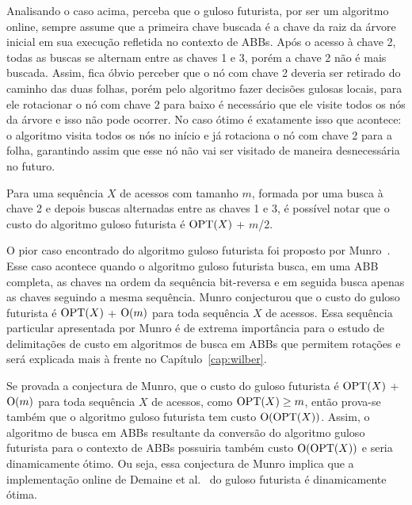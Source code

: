 Analisando o caso acima, perceba que o guloso futurista, por ser um algoritmo online, sempre assume que a primeira chave buscada é a chave da raiz da árvore inicial em sua execução refletida no contexto de ABBs. Após o acesso à chave 2, todas as buscas se alternam entre as chaves 1 e 3, porém a chave 2 não é mais buscada. Assim, fica óbvio perceber que o nó com chave 2 deveria ser retirado do caminho das duas folhas, porém pelo algoritmo fazer decisões gulosas locais, para ele rotacionar o nó com chave 2 para baixo é necessário que ele visite todos os nós da árvore e isso não pode ocorrer. No caso ótimo é exatamente isso que acontece: o algoritmo visita todos os nós no início e já rotaciona o nó com chave 2 para a folha, garantindo assim que esse nó não vai ser visitado de maneira desnecessária no futuro.

Para uma sequência $X$ de acessos com tamanho $m$, formada por uma busca à chave 2 e depois buscas alternadas entre as chaves 1 e 3, é possível notar que o custo do algoritmo guloso futurista é $\mathrm{OPT}(X)$ + $m$/2.

O pior caso encontrado do algoritmo guloso futurista foi proposto por Munro~\cite{munro}. Esse caso acontece quando o algoritmo guloso futurista busca, em uma ABB completa, as chaves na ordem da sequência bit-reversa e em seguida busca apenas as chaves seguindo a mesma sequência. Munro conjecturou que o custo do guloso futurista é $\mathrm{OPT}(X)$ + $\mathrm{O}(m)$ para toda sequência $X$ de acessos. Essa sequência particular apresentada por Munro é de extrema importância para o estudo de delimitações de custo em algoritmos de busca em ABBs que permitem rotações e será explicada mais à frente no Capítulo~\ref{cap:wilber}.

Se provada a conjectura de Munro, que o custo do guloso futurista é $\mathrm{OPT}(X)$ + $\mathrm{O}(m)$ para toda sequência $X$ de acessos, como $\mathrm{OPT}(X) \geq m$, então prova-se também que o algoritmo guloso futurista tem custo $\mathrm{O}(\mathrm{OPT}(X))$. Assim, o algoritmo de busca em ABBs resultante da conversão do algoritmo guloso futurista para o contexto de ABBs possuiria também custo $\mathrm{O}(\mathrm{OPT}(X))$ e seria dinamicamente ótimo. Ou seja, essa conjectura de Munro implica que a implementação online de Demaine et al.~\cite{geometry_of_bst} do guloso futurista é dinamicamente ótima.